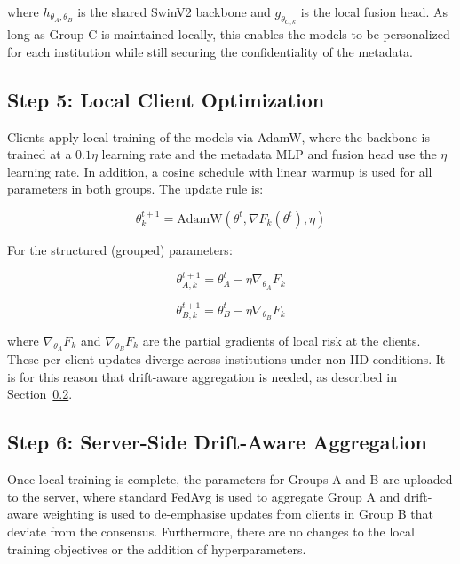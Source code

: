 \documentclass{ieeeaccess}
\begin{document}
where $h_{\theta_A,\theta_B}$ is the shared SwinV2 backbone and $g_{\theta_{C,k}}$ is the local fusion head. As long as Group C is maintained locally, this enables the models to be personalized for each institution while still securing the confidentiality of the metadata.

\subsection{Step 5: Local Client Optimization}

Clients apply local training of the models via AdamW, where the backbone is trained at a $0.1\eta$ learning rate and the metadata MLP and fusion head use the $\eta$ learning rate. In addition, a cosine schedule with linear warmup is used for all parameters in both groups. The update rule is:

\begin{equation}
\label{eq:local_update}
\theta_k^{t+1} = \text{AdamW}(\theta^t, \nabla F_k(\theta^t), \eta)
\end{equation}

For the structured (grouped) parameters:

\begin{equation}
\label{eq:groupA_update}
\theta_{A,k}^{t+1} = \theta_A^t - \eta \nabla_{\theta_A} F_k
\end{equation}

\begin{equation}
\label{eq:groupB_update}
\theta_{B,k}^{t+1} = \theta_B^t - \eta \nabla_{\theta_B} F_k
\end{equation}

where $\nabla_{\theta_A} F_k$ and $\nabla_{\theta_B} F_k$ are the partial gradients of local risk at the clients. These per-client updates diverge across institutions under non-IID conditions. It is for this reason that drift-aware aggregation is needed, as described in Section~\ref{sec:drift_agg}.

\subsection{Step 6: Server-Side Drift-Aware Aggregation}
\label{sec:drift_agg}

Once local training is complete, the parameters for Groups A and B are uploaded to the server, where standard FedAvg is used to aggregate Group A and drift-aware weighting is used to de-emphasise updates from clients in Group B that deviate from the consensus. Furthermore, there are no changes to the local training objectives or the addition of hyperparameters.
\end{document}
